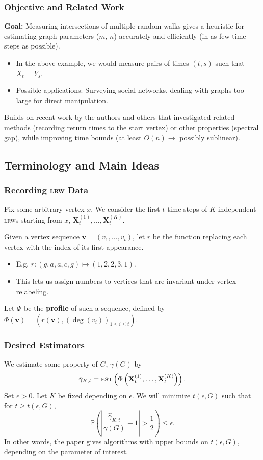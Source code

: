 \documentclass{beamer}
\newcommand{\Prob}{\mathbb{P}}
\begin{document}
\begin{frame}
\frametitle{Objective and Related Work}
\textbf{Goal:} Measuring intersections of multiple random walks gives a heuristic for estimating graph parameters ($m$, $n$) accurately and efficiently (in as few time-steps as possible).\medskip
\begin{itemize}
    \item In the above example, we would measure pairs of times $(t,s)$ such that $X_t=Y_s$.
    \item Possible applications: Surveying social networks, dealing with graphs too large for direct manipulation.
\end{itemize}\medskip
Builds on recent work by the authors and others that investigated related methods (recording return times to the start vertex) or other properties (spectral gap), while improving time bounds (at least $O(n)\to$ possibly sublinear).
\end{frame}

\subsection{Terminology and Main Ideas}

\begin{frame}
\frametitle{Recording \textsc{lrw} Data}
Fix some arbitrary vertex $x$. We consider the first $t$ time-steps of $K$ independent \textsc{lrw}s starting from $x$, $\textbf{X}^{(1)}_t,\dots,\textbf{X}^{(K)}_t$.\medskip 

Given a vertex sequence $\mathbf{v}=(v_1,\dots,v_t)$, let $r$ be the function replacing each vertex with the index of its first appearance.
\begin{itemize}
    \item E.g. $r:(g,a,a,c,g)\mapsto (1,2,2,3,1)$.
    \item This lets us assign numbers to vertices that are invariant under vertex-relabeling. 
\end{itemize}\medskip

Let $\Phi$ be the \textbf{profile} of such a sequence, defined by $\Phi(\mathbf{v})=(r(\mathbf{v}),(\deg(v_i))_{1\leq i\leq t})$.
\end{frame}

\begin{frame}
\frametitle{Desired Estimators}
We estimate some property of $G$, $\gamma(G)$ by 
    \[\hat{\gamma}_{K,t}=\textsc{est}\left(\Phi\left(\textbf{X}^{(1)}_t,\dots,\textbf{X}^{(K)}_t\right)\right).\]
Set $\epsilon>0$. Let $K$ be fixed depending on $\epsilon$. We will minimize $t(\epsilon,G)$ such that for $t\geq t(\epsilon,G)$, 
    \[\Prob\left(\left|\frac{\hat{\gamma}_{K,t}}{\gamma(G)}-1\right|>\frac{1}{2}\right)\leq \epsilon.\]
In other words, the paper gives algorithms with upper bounds on $t(\epsilon,G)$, depending on the parameter of interest.
\end{frame}
\end{document}
